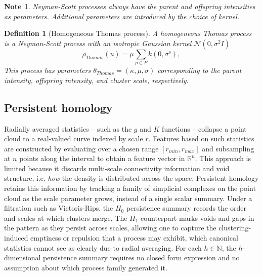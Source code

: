 \documentclass[11pt,a4paper]{article}
\newcommand{\R}{\mathbb{R}}
\newcommand{\N}{\mathbb{N}}
\newcommand{\mo}{\mu}
\theoremstyle{definitioncolon}
\newtheorem{definition}{Definition}[section]
\newtheorem*{note}{Note}
\begin{document}
    \begin{note}
        Neyman-Scott processes always have the parent and offspring intensities
        as parameters. Additional parameters are introduced by the choice of
        kernel.
    \end{note}

    \begin{definition}[Homogeneous Thomas process]
    \label{def:thomas}
        A homogeneous Thomas process is a Neyman-Scott process with an isotropic
        Gaussian kernel $\mathcal{N}(0, \sigma^2I)$
            \[
            \rho_{Thomas}(u) = \mo \sum_{p \in P} k(0, \sigma^s),
            \]
        This process has parameters $\theta_{Thomas} = (\kappa, \mu, \sigma)$
        corresponding to the parent intensity, offspring intensity, and cluster
        scale, respectively.
    \end{definition}

\subsection{Persistent homology}
\label{ssec:persistence}

Radially averaged statistics -- such as the $g$ and $K$ functions -- collapse
a point cloud to a real-valued curve indexed by scale $r$. Features based on such
statistics are constructed by evaluating over a chosen range $[r_{min}, r_{max}]$
and subsampling at $n$ points along the interval to obtain a feature vector in $\R^n$.
This approach is limited because it discards multi-scale connectivity information and
void structure, i.e. \emph{how} the density is distributed across the space.
Persistent homology retains this information by tracking a family of simplicial
complexes on the point cloud as the scale parameter grows, instead of a single scalar
summary. Under a filtration such as Vietoris-Rips, the $H_0$ persistence summary records
the order and scales at which clusters merge. The $H_1$ counterpart marks voids and gaps
in the pattern as they persist across scales, allowing one to capture the clustering-induced
emptiness or repulsion that a process may exhibit, which canonical statistics cannot see as clearly
due to radial averaging.
For each $h \in \N$, the $h$-dimensional persistence summary requires no closed form expression
and no assumption about which process family generated it.
\end{document}
